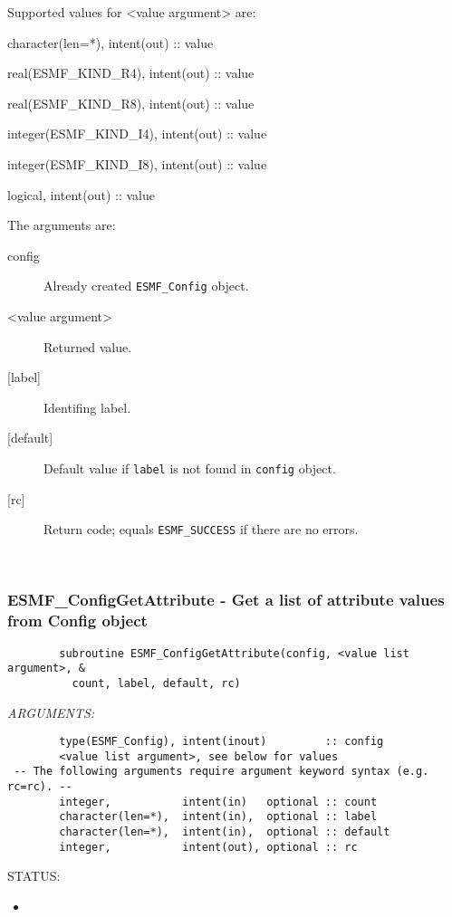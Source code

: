         Supported values for <value argument> are:
        \begin{description}
        \item character(len=*), intent(out)          :: value
        \item real(ESMF\_KIND\_R4), intent(out)      :: value    
        \item real(ESMF\_KIND\_R8), intent(out)      :: value
        \item integer(ESMF\_KIND\_I4), intent(out)   :: value
        \item integer(ESMF\_KIND\_I8), intent(out)   :: value
        \item logical, intent(out)                   :: value
        \end{description}
  
     The arguments are:
     \begin{description}
     \item [config]
       Already created {\tt ESMF\_Config} object.
     \item [<value argument>]
       Returned value.
     \item [{[label]}]
       Identifing label. 
     \item [{[default]}]
       Default value if {\tt label} is not found in {\tt config} object. 
     \item [{[rc]}]
       Return code; equals {\tt ESMF\_SUCCESS} if there are no errors.
     \end{description} 
 
\mbox{}\hrulefill\ 
 
\subsubsection [ESMF\_ConfigGetAttribute] {ESMF\_ConfigGetAttribute - Get a list of attribute values from Config object}


  
\begin{verbatim}        subroutine ESMF_ConfigGetAttribute(config, <value list argument>, &
          count, label, default, rc)\end{verbatim}{\em ARGUMENTS:}
\begin{verbatim}        type(ESMF_Config), intent(inout)         :: config     
        <value list argument>, see below for values      
 -- The following arguments require argument keyword syntax (e.g. rc=rc). --
        integer,           intent(in)   optional :: count
        character(len=*),  intent(in),  optional :: label 
        character(len=*),  intent(in),  optional :: default 
        integer,           intent(out), optional :: rc     \end{verbatim}
{\sf STATUS:}
   \begin{itemize}
   \item{}
   \end{itemize}
  
